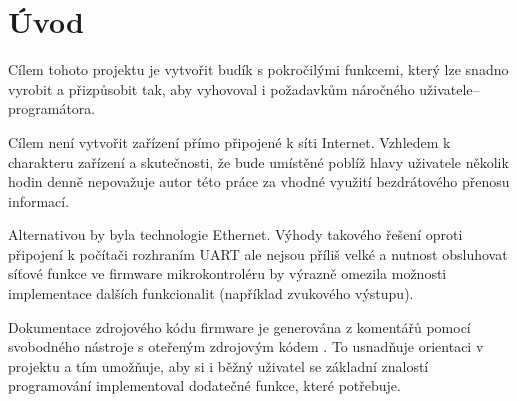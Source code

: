 \section*{Úvod}  %
Cílem tohoto projektu je vytvořit budík s pokročilými funkcemi, který lze
snadno vyrobit a přizpůsobit tak, aby vyhovoval i požadavkům náročného
uživatele--programátora. %

Cílem není vytvořit zařízení přímo připojené k síti Internet. Vzhledem k
charakteru zařízení a skutečnosti, že bude umístěné poblíž hlavy uživatele
několik hodin denně nepovažuje autor této práce za vhodné využití bezdrátového
přenosu informací.

Alternativou by byla technologie Ethernet. Výhody takového řešení oproti
připojení k počítači rozhraním UART ale nejsou příliš velké a nutnost
obsluhovat síťové funkce ve firmware mikrokontroléru by výrazně omezila
možnosti implementace dalších funkcionalit (například zvukového výstupu).

Dokumentace zdrojového kódu firmware je generována z komentářů pomocí
svobodného nástroje s oteřeným zdrojovým kódem . To usnadňuje
orientaci v projektu a tím umožňuje, aby si i běžný uživatel se základní
znalostí programování implementoval dodatečné funkce, které potřebuje.



